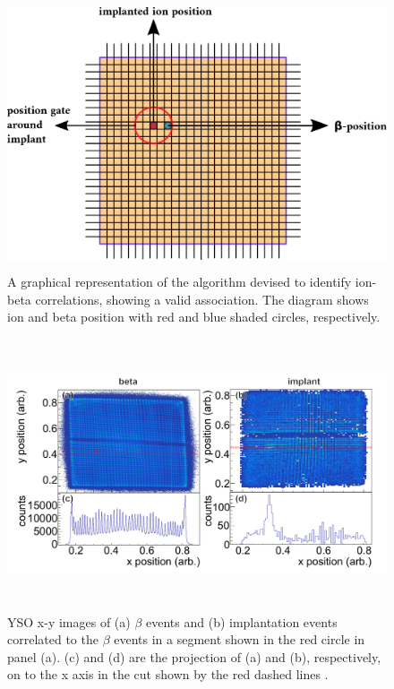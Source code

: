 \documentclass[a4paper,12pt,twoside]{report}
\begin{document}
\begin{figure}[h!]
    \centering
    \includegraphics[width=12cm,height=8cm]{pastedImage.png}
    \caption[A graphical representation of the algorithm devised to identify ion-beta]{A graphical representation of the algorithm devised to identify ion-beta correlations, showing a valid association. The diagram shows ion and beta position with red and blue shaded circles, respectively.}
    \label{fig:ion_beta_correlations}
\end{figure}

\begin{figure}[h!]
    \centering
    \includegraphics[width=17cm,height=8cm]{ion_beta_correlations.png}
    \caption[YSO x-y images of (a) $\beta$ events and (b) implantation events correlated]{YSO x-y images of (a) $\beta$ events and (b) implantation events correlated to the $\beta$ events in a segment shown in the red circle in panel (a). (c) and (d) are the projection of (a) and (b), respectively, on to the x axis in the cut shown by the red dashed lines \cite{yso2018}.}
\label{fig:ysocorrelations}
\end{figure}
\end{document}
